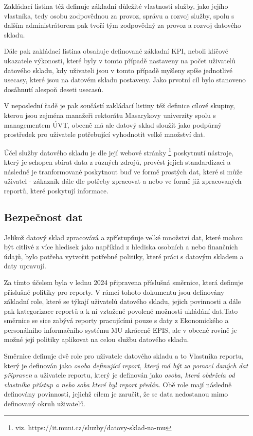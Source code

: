 \documentclass[
  digital,     %
  twoside,     %
  lof,         %
  lot,         %
]{fithesis4}
\begin{document}
Zakládací listina též definuje základní důležité vlastnosti služby, jako jejího vlastníka, tedy osobu zodpovědnou za provoz, správu a rozvoj služby, spolu s dalším administrátorem pak tvoří tým zodpovědný za provoz a rozvoj datového skladu.

Dále pak zakládací listina obsahuje definované základní KPI, neboli klíčové ukazatele výkonosti, které byly v tomto případě nastaveny na počet uživatelů datového skladu, kdy uživateli jsou v tomto případě myšleny spíše jednotlivé usecasy, které jsou na datovém skladu postaveny. Jako prvotní cíl bylo stanoveno dosáhnutí alespoň deseti usecasů.

V neposlední řadě je pak součástí zakládací listiny též definice cílové skupiny, kterou jsou zejména manažeři rektorátu Masarykovy univerzity spolu s managementem ÚVT, obecně má ale datový sklad sloužit jako podpůrný prostředek pro uživatele potřebující vyhodnotit velké množství dat.

Účel služby datového skladu je dle její webové stránky \footnote{viz. https://it.muni.cz/sluzby/datovy-sklad-na-mu} poskytnutí nástroje, který je schopen sbírat data z různých zdrojů, provést jejich standardizaci a následně je tranformované poskytnout buď ve formě prostých dat, které si může uživatel - zákazník dále dle potřeby zpracovat a nebo ve formě již zpracovaných reportů, které poskytují informace. 
\subsection{Bezpečnost dat}
\label{data_sec}
Jelikož datový sklad zpracovává a zpřístupňuje velké množství dat, které mohou být citlivé z více hledisek jako například z hlediska osobních a nebo finančních údajů, bylo potřeba vytvořit potřebné politiky, které práci s datovým skladem a daty upravují. 

Za tímto účelem byla v lednu 2024 připravena příslušná směrnice, která definuje příslušné politiky pro reporty. V rámci tohoto dokumentu jsou definovány základní role, které se týkají uživatelů datového skladu, jejich povinnosti a dále pak kategorizace reportů a k ní vztažené povolené možnosti ukládání dat.Tato směrnice se sice zabývá reporty pracujícími pouze s daty z Ekonomického a personálního informačního systému MU zkráceně EPIS, ale v obecné rovině je možné její politiky aplikovat na celou službu datového skladu. \parencite{UVTMUNI2024}

Směrnice definuje dvě role pro uživatele datového skladu a to Vlastníka reportu, který je definován jako \emph{osoba definující report, který má být za pomocí daných dat připraven} a uživatele reportu, který je definován jako \emph{osoba, která obdržela od vlastníka přístup a nebo soba které byl report předán}. Obě role mají následně definovány povinnosti, jejichž cílem je zaručit, že se data nedostanou mimo definovaný okruh uživatelů. 
\end{document}
